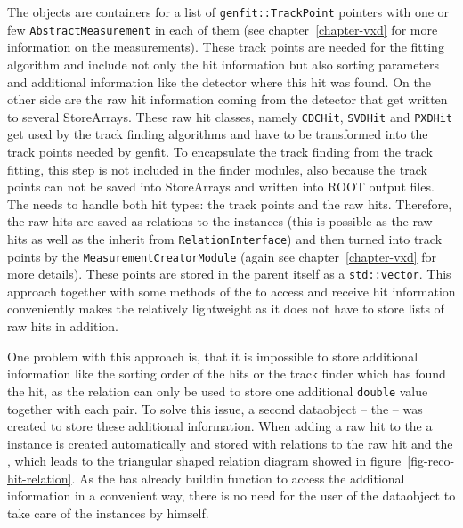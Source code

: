 The \Track objects are containers for a list of \texttt{genfit::TrackPoint} pointers with one or few \texttt{AbstractMeasurement} in each of them (see chapter~\ref{chapter-vxd} for more information on the measurements). These track points are needed for the fitting algorithm and include not only the hit information but also sorting parameters and additional information like the detector where this hit was found. On the other side are the raw hit information coming from the detector that get written to several StoreArrays. These raw hit classes, namely \texttt{CDCHit}, \texttt{SVDHit} and \texttt{PXDHit} get used by the track finding algorithms and have to be transformed into the track points needed by genfit. To encapsulate the track finding from the track fitting, this step is not included in the finder modules, also because the track points can not be saved into StoreArrays and written into ROOT output files. The \RecoTrack needs to handle both hit types: the track points and the raw hits. Therefore, the raw hits are saved as relations to the \RecoTrack instances (this is possible as the raw hits as well as the \RecoTrack inherit from \texttt{RelationInterface}) and then turned into track points by the \texttt{MeasurementCreatorModule} (again see chapter~\ref{chapter-vxd} for more details). These points are stored in the parent \Track itself as a \texttt{std::vector}. This approach together with some methods of the \RecoTrack to access and receive hit information conveniently makes the \RecoTrack relatively lightweight as it does not have to store lists of raw hits in addition.

One problem with this approach is, that it is impossible to store additional information like the sorting order of the hits or the track finder which has found the hit, as the relation can only be used to store one additional \texttt{double} value together with each pair. To solve this issue, a second dataobject -- the \Hit -- was created to store these additional information. When adding a raw hit to the \RecoTrack a \Hit instance is created automatically and stored with relations to the raw hit and the \RecoTrack, which leads to the triangular shaped relation diagram showed in figure~\ref{fig-reco-hit-relation}. As the \RecoTrack has already buildin function to access the additional information in a convenient way, there is no need for the user of the dataobject to take care of the \Hit instances by himself. 

